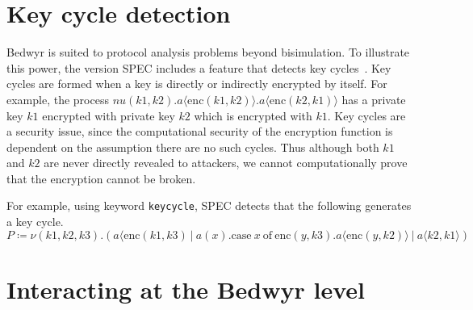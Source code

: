 \documentclass{article}
\begin{document}
\section{Key cycle detection}
\label{sec:keycycle}
Bedwyr is suited to protocol analysis problems beyond bisimulation. To illustrate this power, the version SPEC includes a feature that detects key cycles~\cite{comon-lundh10tocl}.
Key cycles are formed when a key is directly or indirectly encrypted by itself.
For example, the process $nu(k1,k2).a\langle\mathrm{enc}(k1,k2)\rangle.a\langle \mathrm{enc}(k2,k1)\rangle$ 
has a private key $k1$ encrypted with private key $k2$ which is encrypted with $k1$.
Key cycles are a security issue, since the computational security of the encryption function is dependent on the assumption there are no such cycles.
Thus although both $k1$ and $k2$ are never directly revealed to attackers, we cannot computationally prove that the encryption cannot be broken.
 
For example, using keyword \texttt{keycycle}, SPEC detects that the following generates a key cycle.
\[
P \coloneqq
\nu(k1,k2,k3).(a\langle\mathrm{enc}(k1,k3) ~|~ a(x).\mathrm{case}~x~\mathrm{of}~\mathrm{enc}(y,k3).a\langle\mathrm{enc}(y,k2)\rangle ~|~ a\langle k2,k1\rangle)
\]


\section{Interacting at the Bedwyr level}
\label{sec:bedwyr}

\end{document}
